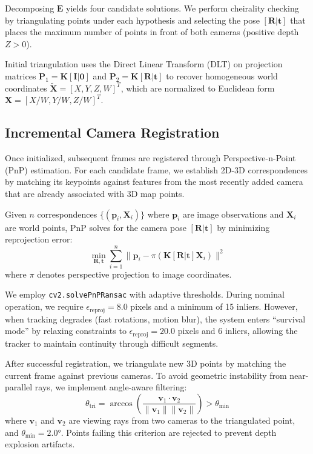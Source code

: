 \documentclass[10pt,twocolumn,letterpaper]{article}
\begin{document}
Decomposing $\mathbf{E}$ yields four candidate solutions. We perform cheirality checking by triangulating points under each hypothesis and selecting the pose $[\mathbf{R}|\mathbf{t}]$ that places the maximum number of points in front of both cameras (positive depth $Z > 0$).

Initial triangulation uses the Direct Linear Transform (DLT) on projection matrices $\mathbf{P}_1 = \mathbf{K}[\mathbf{I}|\mathbf{0}]$ and $\mathbf{P}_2 = \mathbf{K}[\mathbf{R}|\mathbf{t}]$ to recover homogeneous world coordinates $\tilde{\mathbf{X}} = [X, Y, Z, W]^T$, which are normalized to Euclidean form $\mathbf{X} = [X/W, Y/W, Z/W]^T$.

\subsection{Incremental Camera Registration}

Once initialized, subsequent frames are registered through Perspective-n-Point (PnP) estimation. For each candidate frame, we establish 2D-3D correspondences by matching its keypoints against features from the most recently added camera that are already associated with 3D map points.

Given $n$ correspondences $\{(\mathbf{p}_i, \mathbf{X}_i)\}$ where $\mathbf{p}_i$ are image observations and $\mathbf{X}_i$ are world points, PnP solves for the camera pose $[\mathbf{R}|\mathbf{t}]$ by minimizing reprojection error:
\begin{equation}
\min_{\mathbf{R},\mathbf{t}} \sum_{i=1}^{n} \| \mathbf{p}_i - \pi(\mathbf{K}[\mathbf{R}|\mathbf{t}]\mathbf{X}_i) \|^2
\end{equation}
where $\pi$ denotes perspective projection to image coordinates.

We employ \texttt{cv2.solvePnPRansac} with adaptive thresholds. During nominal operation, we require $\epsilon_{\text{reproj}} = 8.0$ pixels and a minimum of 15 inliers. However, when tracking degrades (fast rotations, motion blur), the system enters ``survival mode'' by relaxing constraints to $\epsilon_{\text{reproj}} = 20.0$ pixels and 6 inliers, allowing the tracker to maintain continuity through difficult segments.

After successful registration, we triangulate new 3D points by matching the current frame against previous cameras. To avoid geometric instability from near-parallel rays, we implement angle-aware filtering:
\begin{equation}
\theta_{\text{tri}} = \arccos\left(\frac{\mathbf{v}_1 \cdot \mathbf{v}_2}{\|\mathbf{v}_1\| \|\mathbf{v}_2\|}\right) > \theta_{\text{min}}
\end{equation}
where $\mathbf{v}_1$ and $\mathbf{v}_2$ are viewing rays from two cameras to the triangulated point, and $\theta_{\text{min}} = 2.0°$. Points failing this criterion are rejected to prevent depth explosion artifacts.
\end{document}
